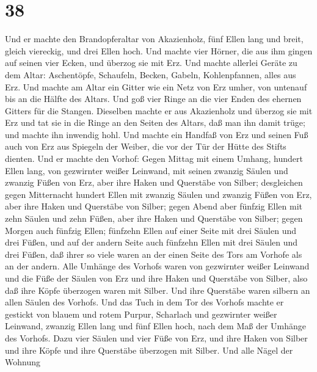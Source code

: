 \hypertarget{section-37}{%
\section{38}\label{section-37}}

 Und er machte den Brandopferaltar von Akazienholz, fünf
Ellen lang und breit, gleich viereckig, und drei Ellen hoch.
 Und machte vier Hörner, die aus ihm gingen auf seinen vier
Ecken, und überzog sie mit Erz.  Und machte allerlei Geräte
zu dem Altar: Aschentöpfe, Schaufeln, Becken, Gabeln, Kohlenpfannen,
alles aus Erz.  Und machte am Altar ein Gitter wie ein Netz
von Erz umher, von untenauf bis an die Hälfte des Altars. 
Und goß vier Ringe an die vier Enden des ehernen Gitters für die
Stangen.  Dieselben machte er aus Akazienholz und überzog
sie mit Erz  und tat sie in die Ringe an den Seiten des
Altars, daß man ihn damit trüge; und machte ihn inwendig hohl.
 Und machte ein Handfaß von Erz und seinen Fuß auch von Erz
aus Spiegeln der Weiber, die vor der Tür der Hütte des Stifts dienten.
 Und er machte den Vorhof: Gegen Mittag mit einem Umhang,
hundert Ellen lang, von gezwirnter weißer Leinwand,  mit
seinen zwanzig Säulen und zwanzig Füßen von Erz, aber ihre Haken und
Querstäbe von Silber;  desgleichen gegen Mitternacht
hundert Ellen mit zwanzig Säulen und zwanzig Füßen von Erz, aber ihre
Haken und Querstäbe von Silber;  gegen Abend aber fünfzig
Ellen mit zehn Säulen und zehn Füßen, aber ihre Haken und Querstäbe von
Silber;  gegen Morgen auch fünfzig Ellen; 
fünfzehn Ellen auf einer Seite mit drei Säulen und drei Füßen,
 und auf der andern Seite auch fünfzehn Ellen mit drei
Säulen und drei Füßen, daß ihrer so viele waren an der einen Seite des
Tors am Vorhofe als an der andern.  Alle Umhänge des
Vorhofs waren von gezwirnter weißer Leinwand  und die Füße
der Säulen von Erz und ihre Haken und Querstäbe von Silber, also daß
ihre Köpfe überzogen waren mit Silber. Und ihre Querstäbe waren silbern
an allen Säulen des Vorhofs.  Und das Tuch in dem Tor des
Vorhofs machte er gestickt von blauem und rotem Purpur, Scharlach und
gezwirnter weißer Leinwand, zwanzig Ellen lang und fünf Ellen hoch, nach
dem Maß der Umhänge des Vorhofs.  Dazu vier Säulen und vier
Füße von Erz, und ihre Haken von Silber und ihre Köpfe und ihre
Querstäbe überzogen mit Silber.  Und alle Nägel der Wohnung
